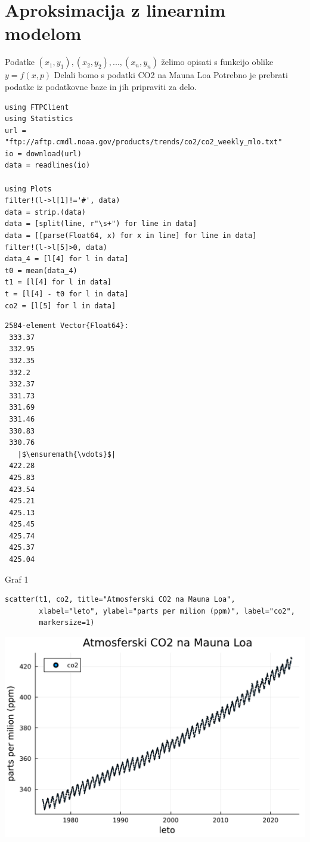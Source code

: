 \documentclass[12pt,a4paper]{article}
\begin{document}
\section{Aproksimacija z linearnim modelom}
Podatke ${(x_1,y_1),(x_2,y_2),...,(x_n,y_n)}$ želimo opisati s funkcijo oblike $y = f(x,p)$ Delali bomo s podatki CO2 na Mauna Loa Potrebno je prebrati podatke iz podatkovne baze in jih pripraviti za delo.


\begin{verbatim}
using FTPClient
using Statistics
url = "ftp://aftp.cmdl.noaa.gov/products/trends/co2/co2_weekly_mlo.txt"
io = download(url)
data = readlines(io)

using Plots
filter!(l->l[1]!='#', data)
data = strip.(data)
data = [split(line, r"\s+") for line in data]
data = [[parse(Float64, x) for x in line] for line in data]
filter!(l->l[5]>0, data)
data_4 = [l[4] for l in data]
t0 = mean(data_4)
t1 = [l[4] for l in data]
t = [l[4] - t0 for l in data] 
co2 = [l[5] for l in data]
\end{verbatim}
\begin{verbatim}
2584-element Vector{Float64}:
 333.37
 332.95
 332.35
 332.2
 332.37
 331.73
 331.69
 331.46
 330.83
 330.76
   |$\ensuremath{\vdots}$|
 422.28
 425.83
 423.54
 425.21
 425.13
 425.45
 425.74
 425.37
 425.04
\end{verbatim}

Graf 1


\begin{verbatim}
scatter(t1, co2, title="Atmosferski CO2 na Mauna Loa",
        xlabel="leto", ylabel="parts per milion (ppm)", label="co2",
        markersize=1)
\end{verbatim}
\includegraphics[width=\linewidth]{jl_AuRI8c/demo_2_1.pdf}
\end{document}
